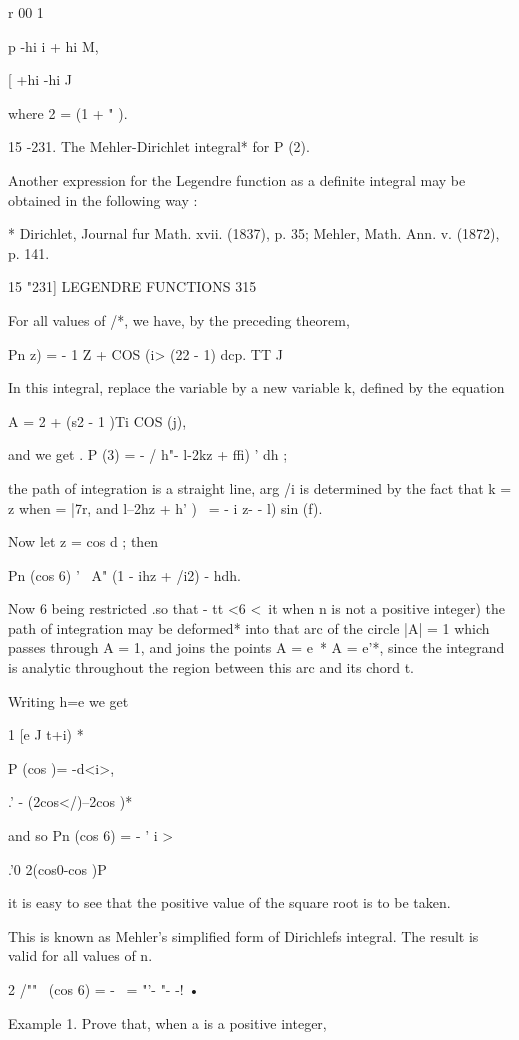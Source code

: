 {{r 00 1

p -hi i + hi M,

[ +hi -hi J

where 2 = (1 + " ).

15 -231. The Mehler-Dirichlet integral* for P (2).

Another expression for the Legendre function as a definite integral
may be obtained in the following way :

* Dirichlet, Journal fur Math. xvii. (1837), p. 35; Mehler, Math. Ann.
v. (1872), p. 141.

15 "231] LEGENDRE FUNCTIONS 315

For all values of /*, we have, by the preceding theorem,

Pn z) = - 1 Z + COS (i> (22 - 1) dcp. TT J

In this integral, replace the variable by a new variable k, defined by
the equation

A = 2 + (s2 - 1 )Ti COS (j),

and we get . P (3) = - / h"- l-2kz + ffi) ' dh ;

the path of integration is a straight line, arg /i is determined by
the fact that k = z when = |7r, and l--2hz + h' )~ = - i z- - l) sin
(f).

Now let z = cos d ; then

Pn (cos 6) ' \ A" (1 - ihz + /i2) - hdh.

Now 6 being restricted .so that - tt <6 <\ it when n is not a positive
integer) the path of integration may be deformed* into that arc of the
circle |A| = 1 which passes through A = 1, and joins the points A =
e~* A = e'*, since the integrand is analytic throughout the region
between this arc and its chord t.

Writing h=e we get

1 [e J t+i) *

P (cos )= -d<i>,

  .' - (2cos</)--2cos )*

and so Pn (cos 6) = - ' i >

 .'0 2(cos0-cos )P

it is easy to see that the positive value of the square root is to be
taken.

This is known as Mehler's simplified form of Dirichlefs integral. The
result is valid for all values of n.

2 /"" \ (cos 6) = - \ = "'- "- -! •

Example 1. Prove that, when a is a positive integer,

}}
